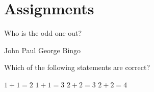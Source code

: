 \section{Assignments}
\begin{singlechoice}\label{sc:beatles}
\begin{questions} 
\question Who is the odd one out?  
	\begin{choices} 
	\choice John %
	\choice Paul
	\choice George
	\correctchoice Bingo
	\end{choices} 
\end{questions}
\end{singlechoice}

\begin{multiplechoice}\label{mc:basic_arithmetic}
\begin{questions} 
\question Which of the following statements are correct?  
	\begin{checkboxes} 
	\correctchoice $1 + 1 = 2$
	\choice $1 + 1 = 3$
	\choice $2 + 2 = 3$
	\correctchoice $2 +2 = 4$
	\end{checkboxes} 
\end{questions}
\end{multiplechoice}

